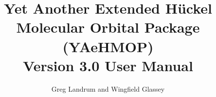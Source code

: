 \documentclass{report}
\begin{document}
\fontsize{12}{14}\selectfont

\title{ Yet Another Extended H\"{u}ckel Molecular Orbital Package \\
 (YAeHMOP) \\
 Version 3.0 User Manual}

\author{Greg Landrum and Wingfield Glassey}

\maketitle

\tableofcontents

\newpage








































\end{document}
